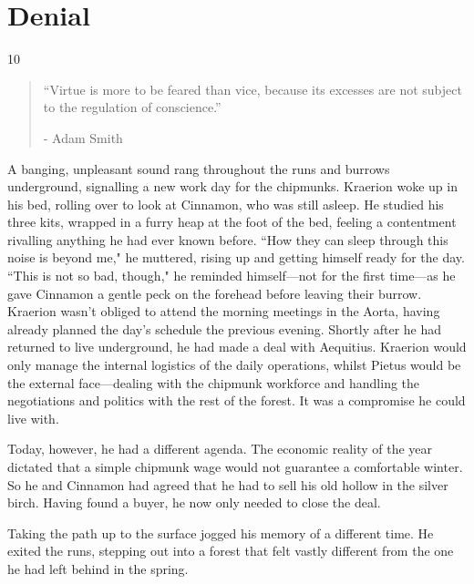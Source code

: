 \chapter{Denial} %

\vspace{-1.3cm}
\begin{localsize}{10}
    \begin{quote}
        “Virtue is more to be feared than vice, because its excesses are not subject to the regulation of conscience.”
        \begin{flushright}- Adam Smith \end{flushright}
    \end{quote}
\end{localsize}
\vspace{1cm}


A banging, unpleasant sound rang throughout the runs and burrows underground, signalling a new work day for the chipmunks.
Kraerion woke up in his bed, rolling over to look at Cinnamon, who was still asleep.
He studied his three kits, wrapped in a furry heap at the foot of the bed, feeling a contentment rivalling anything he had ever known before.
``How they can sleep through this noise is beyond me," he muttered, rising up and getting himself ready for the day.
``This is not so bad, though," he reminded himself---not for the first time---as he gave Cinnamon a gentle peck on the forehead before leaving their burrow.\\

Kraerion wasn't obliged to attend the morning meetings in the Aorta, having already planned the day's schedule the previous evening.
Shortly after he had returned to live underground, he had made a deal with Aequitius.
Kraerion would only manage the internal logistics of the daily operations, whilst Pietus would be the external face---dealing with the chipmunk workforce and handling the negotiations and politics with the rest of the forest.
It was a compromise he could live with.

Today, however, he had a different agenda.
The economic reality of the year dictated that a simple chipmunk wage would not guarantee a comfortable winter.
So he and Cinnamon had agreed that he had to sell his old hollow in the silver birch.
Having found a buyer, he now only needed to close the deal.

Taking the path up to the surface jogged his memory of a different time.
He exited the runs, stepping out into a forest that felt vastly different from the one he had left behind in the spring.

